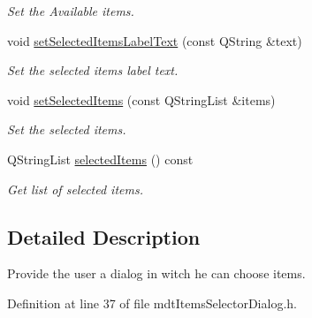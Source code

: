 \begin{DoxyCompactItemize}
\begin{DoxyCompactList}\small\item\em Set the Available items. \end{DoxyCompactList}\item 
\hypertarget{classmdt_items_selector_dialog_a09e9df0c7cac2de513846916f47aa420}{
void \hyperlink{classmdt_items_selector_dialog_a09e9df0c7cac2de513846916f47aa420}{setSelectedItemsLabelText} (const QString \&text)}
\label{classmdt_items_selector_dialog_a09e9df0c7cac2de513846916f47aa420}

\begin{DoxyCompactList}\small\item\em Set the selected items label text. \end{DoxyCompactList}\item 
\hypertarget{classmdt_items_selector_dialog_a8d6642276892d9366704ccf07067020b}{
void \hyperlink{classmdt_items_selector_dialog_a8d6642276892d9366704ccf07067020b}{setSelectedItems} (const QStringList \&items)}
\label{classmdt_items_selector_dialog_a8d6642276892d9366704ccf07067020b}

\begin{DoxyCompactList}\small\item\em Set the selected items. \end{DoxyCompactList}\item 
\hypertarget{classmdt_items_selector_dialog_af6a5f0a0f046391287d3beec91b205d6}{
QStringList \hyperlink{classmdt_items_selector_dialog_af6a5f0a0f046391287d3beec91b205d6}{selectedItems} () const }
\label{classmdt_items_selector_dialog_af6a5f0a0f046391287d3beec91b205d6}

\begin{DoxyCompactList}\small\item\em Get list of selected items. \end{DoxyCompactList}\end{DoxyCompactItemize}


\subsection{Detailed Description}
Provide the user a dialog in witch he can choose items. 

Definition at line 37 of file mdtItemsSelectorDialog.h.



